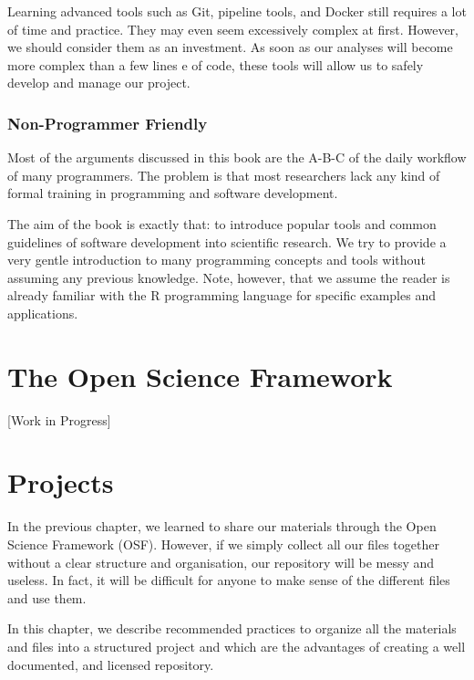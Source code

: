 \documentclass[
  11pt,
]{book}
\begin{document}
Learning advanced tools such as Git, pipeline tools, and Docker still requires a lot of time and practice. They may even seem excessively complex at first. However, we should consider them as an investment. As soon as our analyses will become more complex than a few lines e of code, these tools will allow us to safely develop and manage our project.

\hypertarget{non-programmer-friendly}{%
\subsection{Non-Programmer Friendly}\label{non-programmer-friendly}}

Most of the arguments discussed in this book are the A-B-C of the daily workflow of many programmers. The problem is that most researchers lack any kind of formal training in programming and software development.

The aim of the book is exactly that: to introduce popular tools and common guidelines of software development into scientific research. We try to provide a very gentle introduction to many programming concepts and tools without assuming any previous knowledge. Note, however, that we assume the reader is already familiar with the R programming language for specific examples and applications.

\hypertarget{osf-chapter}{%
\chapter{The Open Science Framework}\label{osf-chapter}}

{[}Work in Progress{]}

\hypertarget{project-chapter}{%
\chapter{Projects}\label{project-chapter}}

In the previous chapter, we learned to share our materials through the Open Science Framework (OSF). However, if we simply collect all our files together without a clear structure and organisation, our repository will be messy and useless. In fact, it will be difficult for anyone to make sense of the different files and use them.

In this chapter, we describe recommended practices to organize all the materials and files into a structured project and which are the advantages of creating a well documented, and licensed repository.
\end{document}
